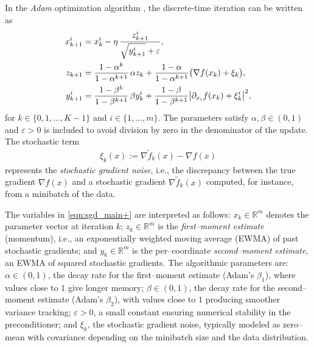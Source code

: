 \documentclass[11pt, a4paper,leqno]{amsart}
\theoremstyle{definition}
\numberwithin{equation}{section}
\begin{document}
 In  the \emph{Adam} optimization algorithm \cite{KingmaBa2015}, the discrete-time iteration can be written as \begin{align}\label{eqn:sgd_main+}
x_{k+1}^i &= x_k^i - \eta\,\frac{z_{k+1}^i}{\sqrt{y_{k+1}^i} + \varepsilon},\notag\\
z_{k+1} &= \frac{1-\alpha^{k}}{1-\alpha^{k+1}}\,\alpha z_{k}
+ \frac{1-\alpha}{1-\alpha^{k+1}} \bigl( \nabla f(x_k) + \xi_k \bigr), \notag\\
y_{k+1}^i &= \frac{1-\beta^{k}}{1-\beta^{k+1}}\,\beta y_{k}^i
+ \frac{1-\beta}{1-\beta^{k+1}} \bigl| \partial_{x_i} f(x_k) + \xi_k^i \bigr|^2,
\end{align}
for $k \in \{0,1,\dots,K-1\}$ and $i \in \{1,\dots,m\}$. The parameters satisfy $\alpha,\beta \in (0,1)$ and $\varepsilon>0$ is included to avoid division by zero in the denominator of the update. The stochastic term
\begin{align}
\xi_k(x) := \nabla \tilde{f}_{k}(x) - \nabla f(x)
\end{align}
represents the \emph{stochastic gradient noise}, i.e., the discrepancy between the true gradient $\nabla f(x)$ and a stochastic gradient $\nabla \tilde{f}_{k}(x)$ computed, for instance, from a minibatch of the data.

The variables in \eqref{eqn:sgd_main+} are interpreted as follows: $x_k\in\mathbb{R}^m$ denotes the parameter vector at iteration $k$; $z_k\in\mathbb{R}^m$ is the \emph{first–moment estimate} (momentum), i.e., an exponentially weighted moving average (EWMA) of past stochastic gradients; and $y_k\in\mathbb{R}^m$ is the per–coordinate \emph{second–moment estimate}, an EWMA of squared stochastic gradients. The algorithmic parameters are: $\alpha\in(0,1)$, the decay rate for the first–moment estimate (Adam’s $\beta_1$), where values close to $1$ give longer memory; $\beta\in(0,1)$, the decay rate for the second–moment estimate (Adam’s $\beta_2$), with values close to $1$ producing smoother variance tracking; $\varepsilon>0$, a small constant ensuring numerical stability in the preconditioner; and $\xi_k$, the stochastic gradient noise, typically modeled as zero–mean with covariance depending on the minibatch size and the data distribution.
\end{document}
